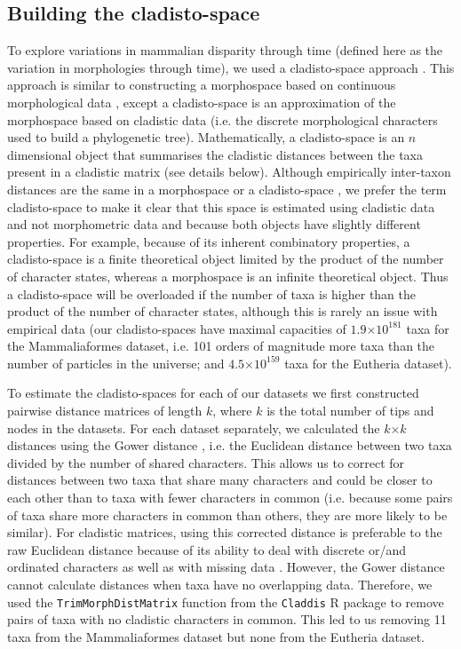 \subsection{Building the cladisto-space}
To explore variations in mammalian disparity through time (defined here as the variation in morphologies through time), we used a cladisto-space approach \citep[e.g.][]{Foote01071994,Foote29111996,Wesley-Hunt2005,Brusatte12092008,friedmanexplosive2010,toljagictriassic-jurassic2013,Hughes20082013}.
This approach is similar to constructing a morphospace based on continuous morphological data \citep[e.g.][]{friedmanexplosive2010}, except a cladisto-space is an approximation of the morphospace based on cladistic data (i.e. the discrete morphological characters used to build a phylogenetic tree).
Mathematically, a cladisto-space is an $n$ dimensional object that summarises the cladistic distances between the taxa present in a cladistic matrix (see details below).
Although empirically inter-taxon distances are the same in a morphospace or a cladisto-space \citep{foth2012different,hetherington2015cladistic}, we prefer the term cladisto-space to make it clear that this space is estimated using cladistic data and not morphometric data and because both objects have slightly different properties.
For example, because of its inherent combinatory properties, a cladisto-space is a finite theoretical object limited by the product of the number of character states, whereas a morphospace is an infinite theoretical object.
Thus a cladisto-space will be overloaded if the number of taxa is higher than the product of the number of character states, although this is rarely an issue with empirical data (our cladisto-spaces have maximal capacities of $1.9$$\times$$10^{181}$ taxa for the Mammaliaformes dataset, i.e. 101 orders of magnitude more taxa than the number of particles in the universe; and $4.5$$\times$$10^{159}$ taxa for the Eutheria dataset).

To estimate the cladisto-spaces for each of our datasets we first constructed pairwise distance matrices of length $k$, where $k$ is the total number of tips and nodes in the datasets.
For each dataset separately, we calculated the $k$$\times$$k$ distances using the Gower distance \citep{Gower71}, i.e. the Euclidean distance between two taxa divided by the number of shared characters. 
This allows us to correct for distances between two taxa that share many characters and could be closer to each other than to taxa with fewer characters in common (i.e. because some pairs of taxa share more characters in common than others, they are more likely to be similar).
For cladistic matrices, using this corrected distance is preferable to the raw Euclidean distance because of its ability to deal with discrete or/and ordinated characters as well as with missing data \citep{anderson2012using}.
However, the Gower distance cannot calculate distances when taxa have no overlapping data.
Therefore, we used the \texttt{TrimMorphDistMatrix} function from the \texttt{Claddis} R package \citep{Claddis} to remove pairs of taxa with no cladistic characters in common.
This led to us removing 11 taxa from the Mammaliaformes dataset but none from the Eutheria dataset.

